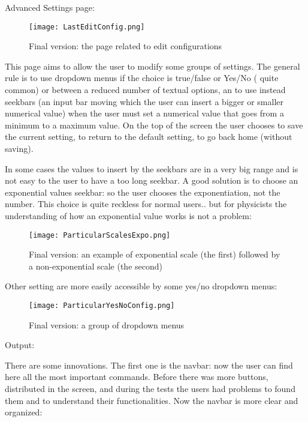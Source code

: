 Advanced Settings page:

\begin{figure}[H]
\centering
\texttt{[image: LastEditConfig.png]} 
\caption{Final version: the page related to edit configurations}
\end{figure}   

This page aims to allow the user to modify some groups of settings. The general rule is to use dropdown menus if the choice is true/false or Yes/No (	quite common) or between a reduced number of textual options, an to use instead  seekbars (an input bar moving which the user can insert a bigger or smaller numerical value) when the user must set a numerical value that goes from a minimum to a maximum value. On the top of the screen the user chooses to save the current setting, to return to the default setting, to go back home (without saving).    

In some cases the values to insert by the seekbars are in a very big range and is not easy to the user to have a too long seekbar. A good solution is to choose an exponential values seekbar: so the user chooses the exponentiation, not the number. This choice is quite reckless for normal users.. but for physicists the understanding of how an exponential value works is not a problem:

\begin{figure}[H]
\centering
\texttt{[image: ParticularScalesExpo.png]} 
\caption{ Final version: an example of exponential scale (the first) followed by a non-exponential scale (the second) }
\end{figure}  

\newpage

Other setting are more easily accessible by some yes/no dropdown menus:


\begin{figure}[H]
\centering
\texttt{[image: ParticularYesNoConfig.png]} 
\caption{ Final version: a group of dropdown menus }
\end{figure}  

\newpage

Output: 

There are some innovations. The first one is the navbar: now the user can find here all the most important commands. Before there was more buttons, distributed in the screen, and during the tests the users had problems to found them and to understand their functionalities. Now the navbar is more clear and organized:

